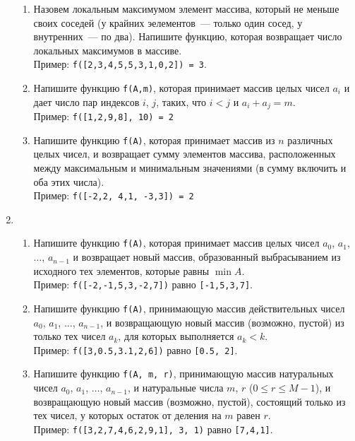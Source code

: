 \documentclass{article}
\begin{document}
\begin{enumerate}[label={}, leftmargin=0pt, itemindent=0pt]
\begin{enumerate}[label=\arabic{enumi}.\arabic*.]
\item 
Назовем локальным максимумом элемент массива, который не меньше своих соседей (у крайних эелементов~--- только один сосед, у внутренних~--- по два). Напишите функцию, которая возвращает число локальных максимумов в массиве.
\\Пример: \texttt{f([2,3,4,5,5,3,1,0,2]) = 3}.

\item Напишите функцию \texttt{f(A,m)}, которая принимает массив целых чисел $a_i$ и дает число пар индексов $i$, $j$, таких, что $i<j$ и $a_i + a_j=m$.
\\Пример: \texttt{f([1,2,9,8],\,10) = 2}

\item  
Напишите функцию \texttt{f(A)}, которая принимает массив из $n$ различных целых чисел, и возвращает сумму элементов массива, расположенных между максимальным и минимальным значениями (в сумму включить и оба этих числа).
\\Пример: \texttt{f([-2,2, 4,1, -3,3]) = 2}

\end{enumerate}



\hrulefill
\item
\begin{enumerate}[label=\arabic{enumi}.\arabic*.]
\item 
Напишите функцию \texttt{f(A)}, которая принимает массив целых чисел $a_0$, $a_1$, $\ldots$, $a_{n-1}$ и возвращает новый массив, образованный выбрасыванием из исходного тех элементов, которые равны $\min A$.
\\Пример: \texttt{f([-2,-1,5,3,-2,7])} равно \texttt{[-1,5,3,7]}.

\item 
Напишите функцию \texttt{f(A)}, принимающую массив действительных чисел $a_0$, $a_1$, $\ldots$, $a_{n-1}$, и возвращающую новый массив (возможно, пустой) из только тех чисел $a_k$, для которых выполняется $a_k<k$.
\\Пример: \texttt{f([3,0.5,3.1,2,6])} равно \texttt{[0.5,\,2]}.

\item 
Напишите функцию \texttt{f(A, m, r)}, принимающую массив натуральных чисел $a_0$, $a_1$, $\ldots$, $a_{n-1}$, и натуральные числа $m$, $r$ ($0 \le r \le M-1$), и возвращающую новый массив (возможно, пустой), состоящий только из тех чисел, у которых  остаток от деления на $m$ равен $r$.
\\Пример: \texttt{f([3,2,7,4,6,2,9,1],\,3,\,1)} равно \texttt{[7,4,1]}.


\end{enumerate}
\end{enumerate}
\end{document}
